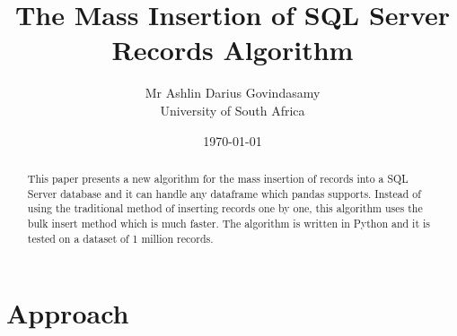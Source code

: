 \documentclass{report}
\title{The Mass Insertion of SQL Server Records Algorithm}
\author{Mr Ashlin Darius Govindasamy\\ \large{University of South Africa}}
\date{\today}
\begin{document}
\maketitle
\newpage

\begin{abstract}
    This paper presents a new algorithm for the mass insertion of records into a SQL Server database and it can handle any dataframe which pandas supports. Instead of using the traditional method of inserting records one by one, this algorithm uses the bulk insert method which is much faster. The algorithm is written in Python and it is tested on a dataset of 1 million records.
\end{abstract}

\tableofcontents


\chapter{Approach}


\newpage
\end{document}
